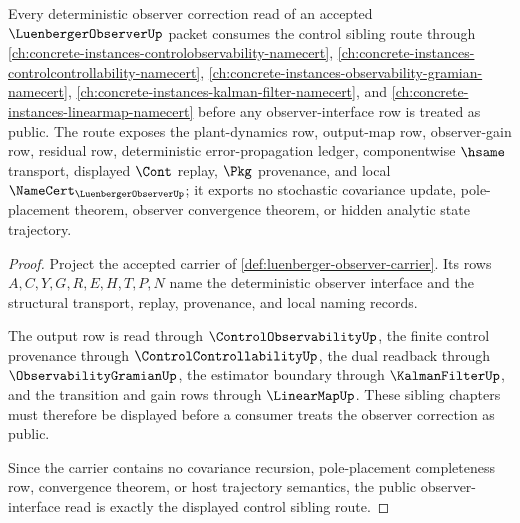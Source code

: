\begin{theorem}
\label{thm:luenberger-observer-control-sibling-dependency-route}
Every deterministic observer correction read of an accepted $\LuenbergerObserverUp$ packet consumes the control sibling route through \autoref{ch:concrete-instances-controlobservability-namecert}, \autoref{ch:concrete-instances-controlcontrollability-namecert}, \autoref{ch:concrete-instances-observability-gramian-namecert}, \autoref{ch:concrete-instances-kalman-filter-namecert}, and \autoref{ch:concrete-instances-linearmap-namecert} before any observer-interface row is treated as public. The route exposes the plant-dynamics row, output-map row, observer-gain row, residual row, deterministic error-propagation ledger, componentwise $\hsame$ transport, displayed $\Cont$ replay, $\Pkg$ provenance, and local $\NameCert_{\LuenbergerObserverUp}$; it exports no stochastic covariance update, pole-placement theorem, observer convergence theorem, or hidden analytic state trajectory.
\end{theorem}
\begin{proof}
Project the accepted carrier of \autoref{def:luenberger-observer-carrier}. Its rows $A,C,Y,G,R,E,H,T,P,N$ name the deterministic observer interface and the structural transport, replay, provenance, and local naming records.

The output row is read through $\ControlObservabilityUp$, the finite control provenance through $\ControlControllabilityUp$, the dual readback through $\ObservabilityGramianUp$, the estimator boundary through $\KalmanFilterUp$, and the transition and gain rows through $\LinearMapUp$. These sibling chapters must therefore be displayed before a consumer treats the observer correction as public.

Since the carrier contains no covariance recursion, pole-placement completeness row, convergence theorem, or host trajectory semantics, the public observer-interface read is exactly the displayed control sibling route.
\end{proof}
